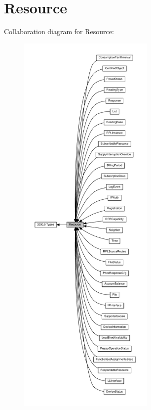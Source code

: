 \hypertarget{group__Resource}{}\section{Resource}
\label{group__Resource}
Collaboration diagram for Resource\+:\nopagebreak
\begin{figure}[H]
\begin{center}
\leavevmode
\includegraphics[height=550pt]{group__Resource}
\end{center}
\end{figure}
